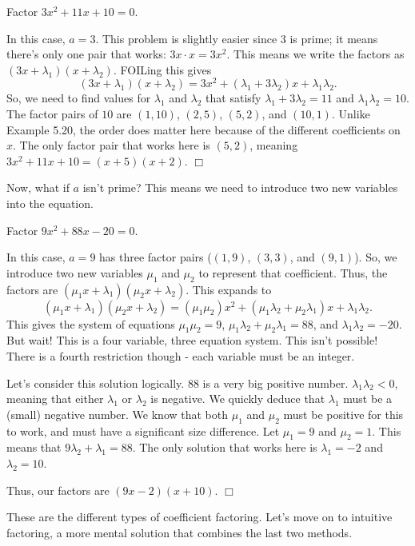 \documentclass[../book.tex]{subfiles}
\begin{document}
\begin{example}
Factor $3x^2+11x+10=0$.  
\end{example}
\begin{solution}
In this case, $a=3$.  This problem is slightly easier since $3$ is prime; it means there's only one pair that works: $3x\cdot x=3x^2$.  This means we write the factors as $(3x+\lambda_1)(x+\lambda_2)$.  FOILing this gives $$(3x+\lambda_1)(x+\lambda_2)=3x^2+(\lambda_1+3\lambda_2)x+\lambda_1\lambda_2.$$  So, we need to find values for $\lambda_1$ and $\lambda_2$ that satisfy $\lambda_1+3\lambda_2=11$ and $\lambda_1\lambda_2=10$.  The factor pairs of $10$ are $(1,10)$, $(2,5)$, $(5,2)$, and $(10,1)$.  Unlike Example 5.20, the order does matter here because of the different coefficients on $x$.  The only factor pair that works here is $(5,2)$, meaning $3x^2+11x+10=(x+5)(x+2)$.  $\Box$
\end{solution}
Now, what if $a$ isn't prime?  This means we need to introduce two new variables into the equation.
\begin{example}
Factor $9x^2+88x-20=0$.
\end{example}
\begin{solution}
In this case, $a=9$ has three factor pairs ($(1,9)$, $(3,3)$, and $(9,1)$).  So, we introduce two new variables $\mu_1$ and $\mu_2$ to represent that coefficient.  Thus, the factors are $(\mu_1x+\lambda_1)(\mu_2x+\lambda_2)$.  This expands to $$(\mu_1x+\lambda_1)(\mu_2x+\lambda_2)=(\mu_1\mu_2)x^2+\left(\mu_1\lambda_2+\mu_2\lambda_1\right)x+\lambda_1\lambda_2.$$
This gives the system of equations $\mu_1\mu_2=9$, $\mu_1\lambda_2+\mu_2\lambda_1=88$, and $\lambda_1\lambda_2=-20$.  But wait!  This is a four variable, three equation system.  This isn't possible!  There is a fourth restriction though - each variable must be an integer.

Let's consider this solution logically.  $88$ is a very big positive number.  $\lambda_1\lambda_2<0$, meaning that either $\lambda_1$ or $\lambda_2$ is negative.  We quickly deduce that $\lambda_1$ must be a (small) negative number.  We know that both $\mu_1$ and $\mu_2$ must be positive for this to work, and must have a significant size difference.  Let $\mu_1=9$ and $\mu_2=1$.  This means that $9\lambda_2+\lambda_1=88$.  The only solution that works here is $\lambda_1=-2$ and $\lambda_2=10$.  

Thus, our factors are $(9x-2)(x+10)$.  $\Box$
\end{solution}
These are the different types of coefficient factoring.  Let's move on to intuitive factoring, a more mental solution that combines the last two methods.
\end{document}
